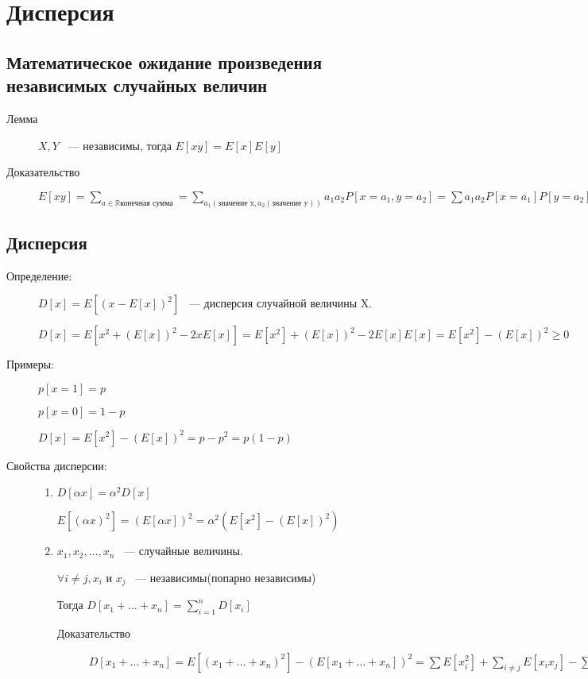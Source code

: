 \documentclass[12pt]{article}
\begin{document}
\section{Дисперсия}
\subsection{Математическое ожидание произведения независимых случайных величин}

\begin{description}
\item[Лемма] $X, Y$ ~--- независимы, тогда $E[xy] = E[x]E[y]$

\item[Доказательство]

$E[xy] = \sum_{a \in \mathbb R \text{конечная сумма}} = \sum_{a_1(\text{значение x}, a_2(\text{значение y}))} a_1 a_2 P[x = a_1, y = a_2] = \sum a_1 a_2 P[x = a_1]P[y = a_2] = (\sum a_1 P[x = a_1])(\sum a_2 P[y = a_2]) = E[x] E[y]$
\end{description}

\subsection{Дисперсия}

\begin{description}

\item[Определение:] $D[x] = E[(x - E[x])^2]$ ~--- дисперсия случайной величины X.

$D[x] = E[x^2 + (E[x])^2 - 2xE[x]] = E[x^2] + (E[x])^2 - 2E[x]E[x] = E[x^2] - (E[x])^2 \ge 0$

\item[Примеры:] 

$p[x = 1] = p$

$p[x = 0] = 1 - p$

$D[x] = E[x^2] - (E[x])^2 = p - p^2 = p(1 - p)$

\item[Свойства дисперсии:]
\begin{enumerate}
\item $D[\alpha x] = \alpha^2D[x]$

$E[(\alpha x)^2] = (E[\alpha x])^2 = \alpha^2(E[x^2] - (E[x])^2)$

\item $x_1, x_2, \ldots, x_n$ ~--- случайные величины.

$\forall i \ne j, x_i$ и $x_j$ ~--- независимы(попарно независимы)

Тогда $D[x_1 + \ldots + x_n] = \sum_{i = 1}^{n} D[x_i]$
\begin{description}
\item [Доказательство]

$D[x_1 + \ldots + x_n] = E[(x_1 + \ldots + x_n)^2] - (E[x_1 + \ldots + x_n])^2 = \sum E[x_i^2] + \sum_{i \ne j}E[x_i x_j] - \sum(E[x_i])^2 - \sum_{i \ne j}E[x_i]E[x_j] = \sum_{i = 1}^{n}E[x_i^2] - (E[x_i])^2 = \sum_{i = 1}^nD[x_i]$
\end{description}
\end{enumerate}

\end{description}
\end{document}
